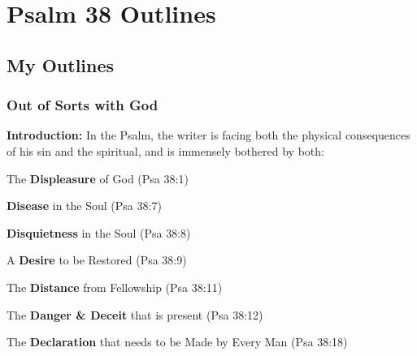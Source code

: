\section{Psalm 38 Outlines}

\subsection{My Outlines}

\subsubsection{Out of Sorts with God}
\textbf{Introduction:} In the Psalm, the writer is facing both the physical consequences of his sin and the spiritual, and is immensely bothered by both:
\begin{compactenum}[I.][8]
    \item The \textbf{Displeasure} of God  (Psa 38:1)
    \item \textbf{Disease} in the Soul  (Psa 38:7)
    \item \textbf{Disquietness} in the Soul  (Psa 38:8)
    \item A \textbf{Desire} to be Restored  (Psa 38:9)
    \item The \textbf{Distance} from Fellowship  (Psa 38:11)
    \item The \textbf{Danger \& Deceit} that is present  (Psa 38:12)
    \item The \textbf{Declaration} that needs to be Made by Every Man  (Psa 38:18)
\end{compactenum}



